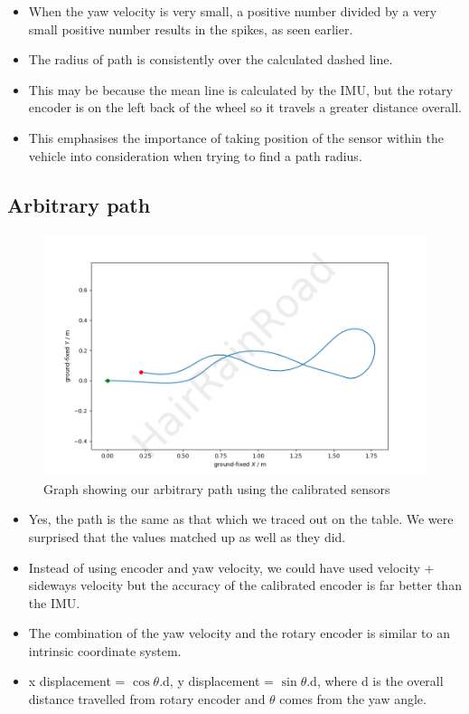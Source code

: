 \documentclass[12pt]{article}
\begin{document}
    \begin{itemize}
        \item When the yaw velocity is very small, a positive number divided by a very small positive number results in the spikes, 
        as seen earlier.
        \item The radius of path is consistently over the calculated dashed line.
        \item This may be because the mean line is calculated by the IMU, but the rotary encoder is on the left back of the wheel
        so it travels a greater distance overall.
        \item This emphasises the importance of taking position of the sensor within the vehicle into consideration when trying to find a path radius.
    \end{itemize}
    \newpage
    \subsection{Arbitrary path}
    \begin{figure}[H]
        \captionsetup{labelfont=bf}
        \includegraphics[width=40pc]{fig9png.png}
        \caption{Graph showing our arbitrary path using the calibrated sensors}\label{figure9}
    \end{figure}
    \begin{itemize}
        \item Yes, the path is the same as that which we traced out on the table. We were surprised that the values matched up as well as they did.
        \item Instead of using encoder and yaw velocity, we could have used velocity + sideways velocity but the accuracy of the calibrated
        encoder is far better than the IMU. 
        \item The combination of the yaw velocity and the rotary encoder is similar to an intrinsic coordinate system. 
        \item x displacement = $ \cos \theta$.d, y displacement = $ \sin \theta$.d, where d is the overall distance travelled from rotary encoder and $\theta$
        comes from the yaw angle.
    \end{itemize}
    \newpage
\end{document}
